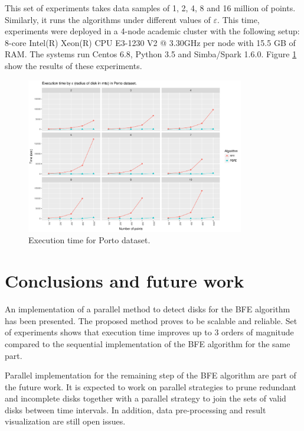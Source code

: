 \documentclass[12pt]{scrartcl}
\begin{document}
This set of experiments takes data samples of 1, 2, 4, 8 and 16 million of points.  Similarly, it runs the algorithms under different values of $\varepsilon$.  This time, experiments were deployed in a 4-node academic cluster with the following setup: 8-core Intel(R) Xeon(R) CPU E3-1230 V2 @ 3.30GHz per node with 15.5 GB of RAM.  The systems run Centos 6.8, Python 3.5 and Simba/Spark 1.6.0.  Figure \ref{fig:porto} show the results of these experiments.

\begin{figure}
 \centering
 \includegraphics[width=0.85\textwidth]{figures/porto} 
 \caption{Execution time for Porto dataset.}
 \label{fig:porto}
\end{figure}

\section{Conclusions and future work}\label{sec:conclusions}

An implementation of a parallel method to detect disks for the BFE algorithm has been presented.  The proposed method proves to be scalable and reliable. Set of experiments shows that execution time improves up to 3 orders of magnitude compared to the sequential implementation of the BFE algorithm for the same part.

Parallel implementation for the remaining step of the BFE algorithm are part of the future work. It is expected to work on parallel strategies to prune redundant and incomplete disks together with a parallel strategy to join the sets of valid disks between time intervals.  In addition, data pre-processing and result visualization are still open issues.



\end{document}
